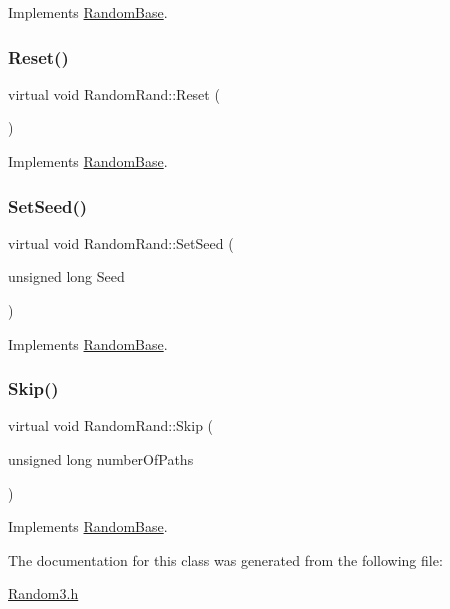 Implements \hyperlink{classRandomBase_aa061fb77f53969f6fbe40c7454c69eb9}{Random\+Base}.

\hypertarget{classRandomRand_a27bd392590f772d66ba75781964ff2c9}{}\label{classRandomRand_a27bd392590f772d66ba75781964ff2c9} 
\subsubsection{\texorpdfstring{Reset()}{Reset()}}
{\footnotesize\ttfamily virtual void Random\+Rand\+::\+Reset (\begin{DoxyParamCaption}{ }\end{DoxyParamCaption})\hspace{0.3cm}{\ttfamily [virtual]}}



Implements \hyperlink{classRandomBase_a6e35c1467b37fc8c5e262297223685eb}{Random\+Base}.

\hypertarget{classRandomRand_abccae7b9cb11121a461e15959536843c}{}\label{classRandomRand_abccae7b9cb11121a461e15959536843c} 
\subsubsection{\texorpdfstring{Set\+Seed()}{SetSeed()}}
{\footnotesize\ttfamily virtual void Random\+Rand\+::\+Set\+Seed (\begin{DoxyParamCaption}\item[{unsigned long}]{Seed }\end{DoxyParamCaption})\hspace{0.3cm}{\ttfamily [virtual]}}



Implements \hyperlink{classRandomBase_ae93f26c38d1675ef07cb1fd29b894b26}{Random\+Base}.

\hypertarget{classRandomRand_ab9e2f1049a7421aef97144a7aedd8d4b}{}\label{classRandomRand_ab9e2f1049a7421aef97144a7aedd8d4b} 
\subsubsection{\texorpdfstring{Skip()}{Skip()}}
{\footnotesize\ttfamily virtual void Random\+Rand\+::\+Skip (\begin{DoxyParamCaption}\item[{unsigned long}]{number\+Of\+Paths }\end{DoxyParamCaption})\hspace{0.3cm}{\ttfamily [virtual]}}



Implements \hyperlink{classRandomBase_a0531f44e3e2a71d14ef1490aa5d90b77}{Random\+Base}.



The documentation for this class was generated from the following file\+:\begin{DoxyCompactItemize}
\item 
\hyperlink{Random3_8h}{Random3.\+h}\end{DoxyCompactItemize}
